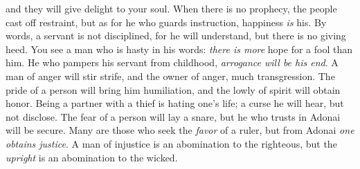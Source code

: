 \begin{biblechapter}
and they will give delight to your soul.
\verse When there is no prophecy, the people cast off restraint, 
but as for he who guards instruction, happiness \textit{is} his.
\verse By words, a servant is not disciplined, 
for he will understand, but there is no giving heed.
\verse You see a man who is hasty in his words: 
\textit{there is more} hope for a fool than him.
\verse He who pampers his servant from childhood, 
\textit{arrogance will be his end}.
\verse A man of anger will stir strife, 
and the owner of anger, much transgression.
\verse The pride of a person will bring him humiliation, 
and the lowly of spirit will obtain honor.
\verse Being a partner with a thief is hating one’s life; 
a curse he will hear, but not disclose.
\verse The fear of a person will lay a snare, 
but he who trusts in Adonai will be secure.
\verse Many are those who seek the \textit{favor} of a ruler, 
but from Adonai \textit{one obtains justice}.
\verse A man of injustice is an abomination to the righteous, 
but the \textit{upright} is an abomination to the wicked.
\end{biblechapter}

